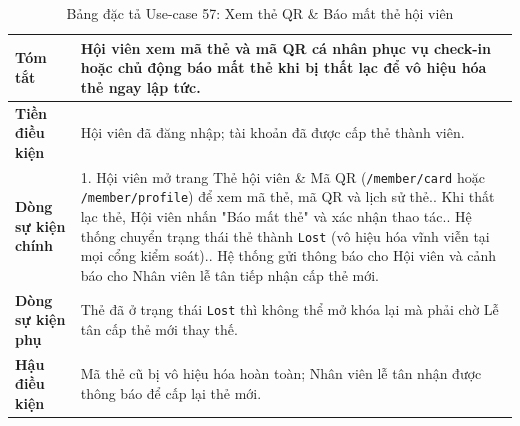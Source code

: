 \documentclass[a4paper,12pt]{article}
\begin{document}
\begin{table}[H]\centering\footnotesize
\begin{tabularx}{\textwidth}{|L{3.2cm}|Y|}
\hline \textbf{Tóm tắt} & Hội viên xem mã thẻ và mã QR cá nhân phục vụ check-in hoặc chủ động báo mất thẻ khi bị thất lạc để vô hiệu hóa thẻ ngay lập tức. \\ \hline
\textbf{Tiền điều kiện} & Hội viên đã đăng nhập; tài khoản đã được cấp thẻ thành viên. \\ \hline
\textbf{Dòng sự kiện chính} & 1. Hội viên mở trang Thẻ hội viên \& Mã QR (\texttt{/member/card} hoặc \texttt{/member/profile}) để xem mã thẻ, mã QR và lịch sử thẻ.. Khi thất lạc thẻ, Hội viên nhấn "Báo mất thẻ" và xác nhận thao tác.. Hệ thống chuyển trạng thái thẻ thành \texttt{Lost} (vô hiệu hóa vĩnh viễn tại mọi cổng kiểm soát).. Hệ thống gửi thông báo cho Hội viên và cảnh báo cho Nhân viên lễ tân tiếp nhận cấp thẻ mới. \\ \hline
\textbf{Dòng sự kiện phụ} & Thẻ đã ở trạng thái \texttt{Lost} thì không thể mở khóa lại mà phải chờ Lễ tân cấp thẻ mới thay thế. \\ \hline
\textbf{Hậu điều kiện} & Mã thẻ cũ bị vô hiệu hóa hoàn toàn; Nhân viên lễ tân nhận được thông báo để cấp lại thẻ mới. \\ \hline
\end{tabularx}
\caption{Bảng đặc tả Use-case 57: Xem thẻ QR \& Báo mất thẻ hội viên}
\end{table}
\end{document}
